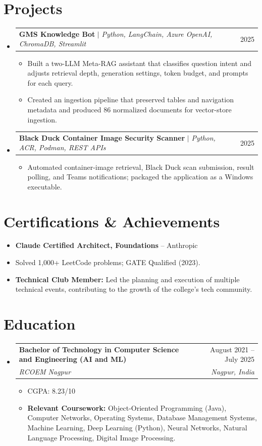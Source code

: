 \documentclass[a4paper,11pt]{article}
\makeatletter
\newcommand{\resumeItem}[1]{\item\small{#1\vspace{-2pt}}}
\newcommand{\resumeSubheading}[4]{
  \vspace{-2pt}\item
    \begin{tabularx}{0.97\textwidth}[t]{@{}>{\raggedright\arraybackslash}X@{\hspace{0.75em}}r@{}}
      \textbf{#1} & #2 \\
      \textit{\small#3} & \textit{\small #4} \\
    \end{tabularx}\vspace{-5pt}
}
\newcommand{\resumeProjectHeading}[2]{
  \item
    \begin{tabularx}{0.97\textwidth}{@{}>{\raggedright\arraybackslash}X@{\hspace{0.75em}}r@{}}
      \small#1 & #2 \\
    \end{tabularx}\vspace{-5pt}
}
\newcommand{\resumeSubItemListStart}{\begin{itemize}[leftmargin=0.15in, label={}]}
\newcommand{\resumeSubItemListEnd}{\end{itemize}}
\newcommand{\resumeItemListStart}{\begin{itemize}}
\newcommand{\resumeItemListEnd}{\end{itemize}\vspace{-5pt}}
\makeatother
\begin{document}
\section{Projects}
\resumeSubItemListStart
  \resumeProjectHeading
    {\textbf{GMS Knowledge Bot} $|$ \emph{Python, LangChain, Azure OpenAI, ChromaDB, Streamlit}}{2025}
    \resumeItemListStart
      \resumeItem{Built a two-LLM Meta-RAG assistant that classifies question intent and adjusts retrieval depth, generation settings, token budget, and prompts for each query.}
      \resumeItem{Created an ingestion pipeline that preserved tables and navigation metadata and produced 86 normalized documents for vector-store ingestion.}
    \resumeItemListEnd
  \resumeProjectHeading
    {\textbf{Black Duck Container Image Security Scanner} $|$ \emph{Python, ACR, Podman, REST APIs}}{2025}
    \resumeItemListStart
      \resumeItem{Automated container-image retrieval, Black Duck scan submission, result polling, and Teams notifications; packaged the application as a Windows executable.}
    \resumeItemListEnd
\resumeSubItemListEnd

\section{Certifications \& Achievements}
\resumeItemListStart
  \resumeItem{\textbf{Claude Certified Architect, Foundations} -- Anthropic}
  \resumeItem{Solved 1,000+ LeetCode problems; GATE Qualified (2023).}
  \resumeItem{\textbf{Technical Club Member:} Led the planning and execution of multiple technical events, contributing to the growth of the college's tech community.}
\resumeItemListEnd

\section{Education}
\resumeSubItemListStart
  \resumeSubheading
    {Bachelor of Technology in Computer Science and Engineering (AI and ML)}{August 2021 -- July 2025}
    {RCOEM Nagpur}{Nagpur, India}
  \resumeItemListStart
    \resumeItem{CGPA: 8.23/10}
    \resumeItem{\textbf{Relevant Coursework:} Object-Oriented Programming (Java), Computer Networks, Operating Systems, Database Management Systems, Machine Learning, Deep Learning (Python), Neural Networks, Natural Language Processing, Digital Image Processing.}
  \resumeItemListEnd
\resumeSubItemListEnd
\end{document}
